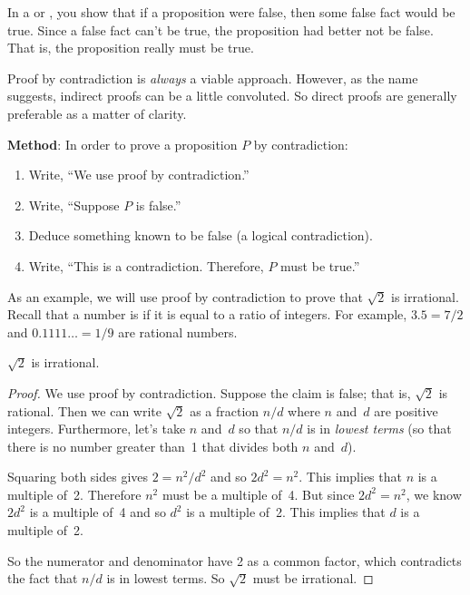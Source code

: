 In a  or , you show that
if a proposition were false, then some false fact would be true.  Since a
false fact can't be true, the proposition had better not be false.  That
is, the proposition really must be true. 

Proof by contradiction is \emph{always} a viable approach.  However, as
the name suggests, indirect proofs can be a little convoluted.  So direct
proofs are generally preferable as a matter of clarity.

\textbf{Method}: In order to prove a proposition $P$ by contradiction:

\begin{enumerate}

\item Write, ``We use proof by contradiction.''

\item Write, ``Suppose $P$ is false.''

\item Deduce something known to be false (a logical contradiction).

\item Write, ``This is a contradiction.  Therefore, $P$ must be
true.''

\end{enumerate}


As an example, we will use proof by contradiction to prove that
$\sqrt{2}$ is irrational.  Recall that a number is  if
it is equal to a ratio 
of integers.  For example, $3.5 = 7/2$ and $0.1111\dots = 1/9$ are
rational numbers.

\begin{theorem}\label{thm:sqrt2irr_by_contra}
$\sqrt{2}$ is irrational.
\end{theorem}

\begin{proof}

We use proof by contradiction.  Suppose the claim is false; that is,
$\sqrt{2}$ is rational.  Then we can write $\sqrt{2}$ as a fraction
$n/d$ where $n$ and~$d$ are positive integers.  Furthermore, let's
take $n$ and~$d$ so that $n/d$ is in \emph{lowest terms} (\ie so that
there is no number greater than~1 that divides both $n$ and~$d$).

Squaring both sides gives $2 = n^2/d^2$ and so $2 d^2 = n^2$.  This
implies that $n$ is a multiple of~2.  Therefore $n^2$ must be a
multiple of~4.  But since $2 d^2 = n^2$, we know $2d^2$ is a multiple
of~4 and so $d^2$ is a multiple of~2.  This implies that $d$ is a
multiple of~2.

So the numerator and denominator have 2 as a common factor, which
contradicts the fact that $n/d$ is in lowest terms.  So $\sqrt{2}$
must be irrational.
\end{proof}

